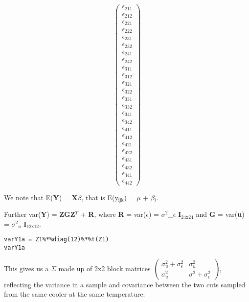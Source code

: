 \documentclass[11pt]{article}
\begin{document}
\[\begin{pmatrix}
                \epsilon_{211} \\ \epsilon_{212} \\ \epsilon_{221} \\ \epsilon_{222} \\ \epsilon_{231} \\ \epsilon_{232} \\ \epsilon_{241} \\ \epsilon_{242} \\
                \epsilon_{311} \\ \epsilon_{312} \\ \epsilon_{321} \\ \epsilon_{322} \\ \epsilon_{331} \\ \epsilon_{332} \\ \epsilon_{341} \\ \epsilon_{342} \\
                \epsilon_{411} \\ \epsilon_{412} \\ \epsilon_{421} \\ \epsilon_{422} \\ \epsilon_{431} \\ \epsilon_{432} \\ \epsilon_{441} \\ \epsilon_{442} \end{pmatrix}
\]
 
We note that E(\textbf{Y}) = \textbf{X$\beta$}, that is E(y$_{\mathrm{ijk}}$) = $\mu$ + $\beta$$_i$.

Further var(\textbf{Y}) = \textbf{ZGZ$^T$} + \textbf{R}, where \textbf{R} = var(\textbf{$\epsilon$}) =
$\sigma$$^2$_$\epsilon$ \textbf{I$_{\mathrm{24x24}}$} and \textbf{G} = var(\textbf{u}) = $\sigma$$^2$$_u$ \textbf{I$_{\mathrm{12 x 12}}$}.


\begin{verbatim}
varY1a = Z1%*%diag(12)%*%t(Z1)
varY1a
\end{verbatim}

This gives us a $\Sigma$ made up of 2x2 block matrices $\begin{pmatrix} \sigma^2_u+\sigma^2_\epsilon & \sigma^2_u\\ \sigma^2_u & \sigma^2+\sigma^2_\epsilon \end{pmatrix}$, reflecting the variance in a sample and covariance between the two cuts sampled from the same cooler at the same temperature:
\end{document}
